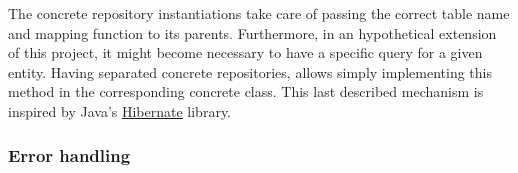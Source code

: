 \documentclass[10pt]{article}
\begin{document}
The concrete repository instantiations take care of passing the correct table
name and mapping function to its parents. Furthermore, in an hypothetical
extension of this project, it might become necessary to have a specific query
for a given entity. Having separated concrete repositories, allows simply
implementing this method in the corresponding concrete class. This last
described mechanism is inspired by Java's
\href{https://hibernate.org/}{Hibernate} library.

\subsubsection{Error handling}
\end{document}
